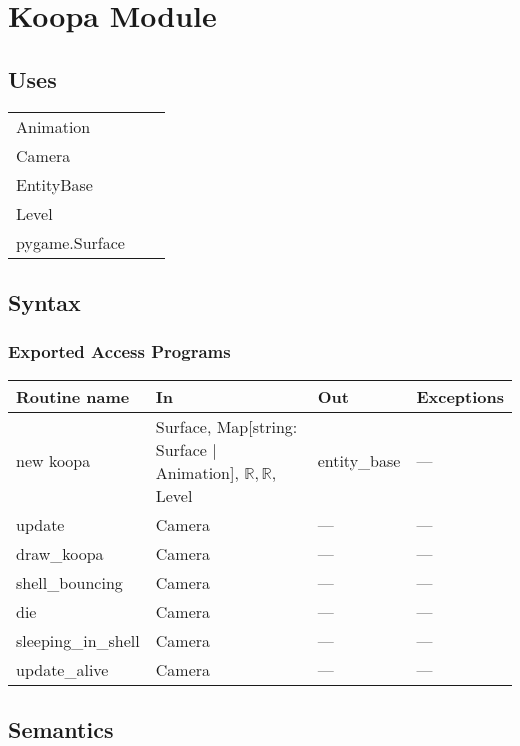 \documentclass[12pt]{article}
\begin{document}
\newpage

\section*{Koopa Module}

\subsection* {Uses}

\begin{tabular}{lll}
    Animation & & \\
    Camera & & \\
    EntityBase & & \\
    Level & & \\
    pygame.Surface & & \\
\end{tabular}

\subsection* {Syntax}

\subsubsection* {Exported Access Programs}

\begin{tabular}{| l | l | l | l |}
\hline
\textbf{Routine name} & \textbf{In} & \textbf{Out} & \textbf{Exceptions}\\
\hline
new koopa & Surface, Map[string: Surface $|$ Animation], $\mathbb{R, R}$, Level & entity\_base & ---\\
\hline
update & Camera & --- & ---\\
\hline
draw\_koopa & Camera & --- & ---\\
\hline
shell\_bouncing & Camera & --- & ---\\
\hline
die & Camera & --- & ---\\
\hline
sleeping\_in\_shell & Camera & --- & ---\\
\hline
update\_alive & Camera & --- & ---\\
\end{tabular}

\subsection* {Semantics}
\end{document}
